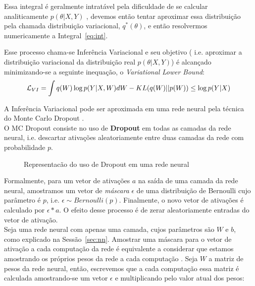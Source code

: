 Essa integral é geralmente intratável pela dificuldade de se calcular
analiticamente $p(\theta | X,Y)$ \citep{ubertime}, devemos então tentar aproximar essa distribuição
pela chamada distribuição variacional, $q^*(\theta)$, e então resolvermos numericamente a Integral~\ref{eq:int}.

Esse processo chama-se Inferência Variacional e seu objetivo ( i.e. aproximar a distribuição variacional da distribuição real $p(\theta | X,Y)$)
é alcançado minimizando-se a seguinte inequação, o \textit{Variational Lower Bound}: \\

\begin{equation}
  \label {eq:ine}
  \mathcal{L}_{VI} = \int q(W) \log p(Y | X,W)dW - \mathnormal{KL}(q(W) ||p(W)) \\
                  \leq \log p(Y|X) 
\end{equation}


A Inferência Variacional pode ser aproximada em uma rede neural pela técnica do Monte Carlo Dropout \citep{dropbayes}. \\

O MC Dropout consiste no uso de \textbf{Dropout} em todas as camadas da rede
neural, i.e. descartar ativações aleatoriamente entre duas camadas da rede com
probabilidade $p$.\\

\begin{figure}
  \centering
  
  \label{fig:dropout}
  \caption{Representacão do uso de Dropout em uma rede neural}
\end{figure}

Formalmente, para um vetor de ativações $a$ na saída de uma
camada da rede neural, amostramos um vetor de \textit{máscara} $\epsilon$ de uma
distribuição de Bernoulli cujo parâmetro é $p$, i.e. $\epsilon \sim Bernoulli(p)$.
Finalmente, o novo vetor de ativações é calculado por $\epsilon * a$. O efeito desse
processo é de zerar aleatoriamente entradas do vetor de ativação.
\\

Seja uma rede neural com apenas uma camada, cujos parâmetros são $W$ e $b$, como explicado na Sessão~\ref{sec:nn}. Amostrar uma máscara para o vetor de ativação a cada computação da rede é equivalente a considerar que estamos amostrando os próprios pesos da rede a cada computação \cite{dropbayes}. Seja $W$ a matriz de pesos da rede neural, então, escrevemos que a cada computação essa matriz é calculada amostrando-se um vetor $\epsilon$ e multiplicando pelo valor atual dos pesos: \\

